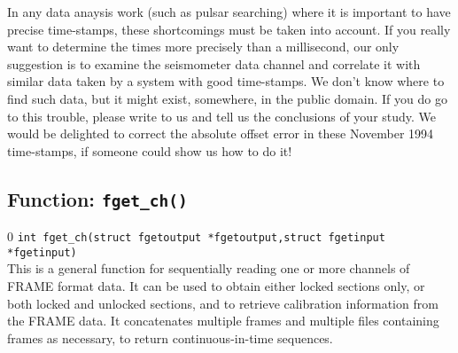 In any data anaysis work (such as pulsar searching) where it is
important to have precise time-stamps, these shortcomings must be taken
into account.  If you really want to determine the times more precisely
than a millisecond, our only suggestion is to examine the seismometer
data channel and correlate it with similar data taken by a system with
good time-stamps.  We don't know where to find such data, but it might
exist, somewhere, in the public domain.  If you do go to this trouble,
please write to us and tell us the conclusions of your study.  We would
be delighted to correct the absolute offset error in these November 1994
time-stamps, if someone could show us how to do it!
\clearpage

\subsection{Function: {\tt fget\_ch()} }
\setcounter{equation}0
{\tt int fget\_ch(struct fgetoutput *fgetoutput,struct fgetinput *fgetinput) }\\
\noindent
This is a general function for sequentially reading one or more
channels of FRAME format data.  It can be used to obtain either locked
sections only, or both locked and unlocked sections, and to retrieve
calibration information from the FRAME data.  It concatenates multiple
frames and multiple files containing frames as necessary, to return
continuous-in-time sequences.

